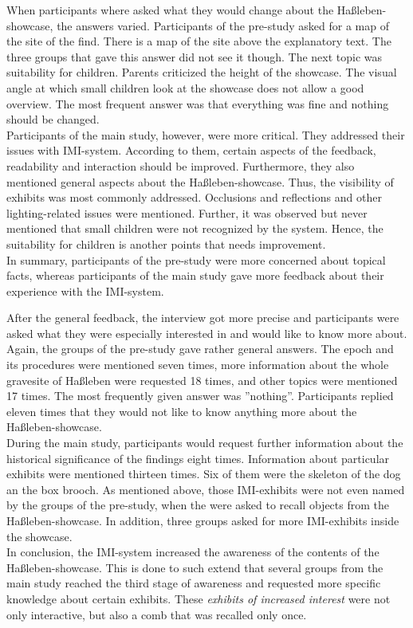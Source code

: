 When participants where asked what they would change about the Haßleben-showcase, the answers varied. Participants of the pre-study asked for a map of the site of the find. There is a map of the site above the explanatory text. The three groups that gave this answer did not see it though. The next topic was suitability for children. Parents criticized the height of the showcase. The visual angle at which small children look at the showcase does not allow a good overview. The most frequent answer was that everything was fine and nothing should be changed. 
\\
Participants of the main study, however, were more critical. They addressed their issues with \ac{IMI}-system. According to them, certain aspects of the feedback, readability and interaction should be improved. Furthermore, they also mentioned general aspects about the Haßleben-showcase. Thus, the visibility of exhibits was most commonly addressed. Occlusions and reflections and other lighting-related issues were mentioned. Further, it was observed but never mentioned that small children were not recognized by the system. Hence, the suitability for children is another points that needs improvement.
\\
In summary, participants of the pre-study were more concerned about topical facts, whereas participants of the main study gave more feedback about their experience with the \ac{IMI}-system.
       
After the general feedback, the interview got more precise and participants were asked what they were especially interested in and would like to know more about. Again, the groups of the pre-study gave rather general answers. The epoch and its procedures were mentioned seven times, more information about the whole gravesite of Haßleben were requested 18 times, and other topics were mentioned 17 times. The most frequently given answer was ''nothing''. Participants replied eleven times that they would not like to know anything more about the Haßleben-showcase.
\\
During the main study, participants would request further information about the historical significance of the findings eight times. Information about particular exhibits were mentioned thirteen times. Six of them were the skeleton of the dog an the box brooch. As mentioned above, those \ac{IMI}-exhibits were not even named by the groups of the pre-study, when the were asked to recall objects from the Haßleben-showcase. In addition, three groups asked for more \ac{IMI}-exhibits inside the showcase.
\\
In conclusion, the \ac{IMI}-system increased the awareness of the contents of the Haßleben-showcase. This is done to such extend that several groups from the main study reached the third stage of awareness and requested more specific knowledge about certain exhibits. These \textit{exhibits of increased interest} were not only interactive, but also a comb that was recalled only once.

